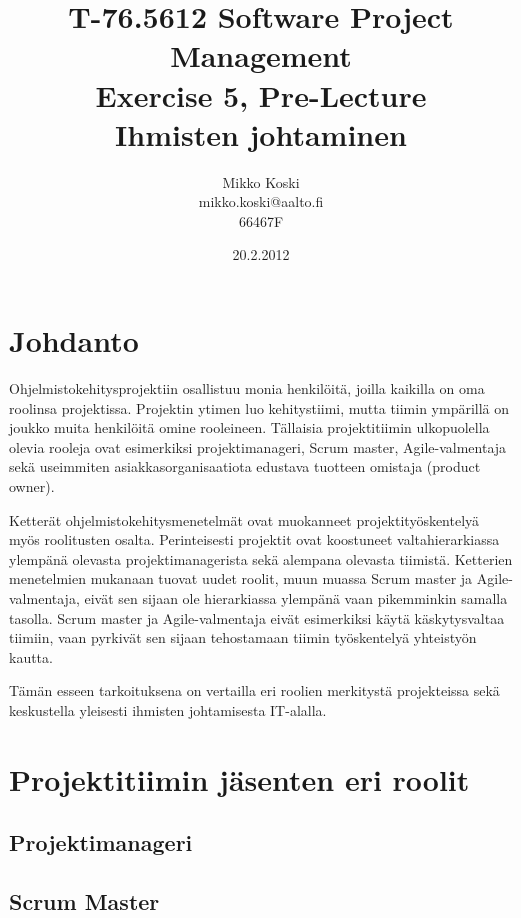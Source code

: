 \documentclass[a4paper]{article}
\begin{document}
\title{\small T-76.5612 Software Project Management \\ Exercise 5, Pre-Lecture \\ \huge Ihmisten johtaminen}
\date{20.2.2012}
\author{Mikko Koski \\ mikko.koski@aalto.fi \\ 66467F}
\maketitle

\normalsize

\section{Johdanto}

Ohjelmistokehitysprojektiin osallistuu monia henkilöitä, joilla kaikilla on oma roolinsa projektissa. Projektin ytimen luo kehitystiimi, mutta tiimin ympärillä on joukko muita henkilöitä omine rooleineen. Tällaisia projektitiimin ulkopuolella olevia rooleja ovat esimerkiksi projektimanageri, Scrum master, Agile-valmentaja sekä useimmiten asiakkasorganisaatiota edustava tuotteen omistaja (product owner).

Ketterät ohjelmistokehitysmenetelmät ovat muokanneet projektityöskentelyä myös roolitusten osalta. Perinteisesti projektit ovat koostuneet valtahierarkiassa ylempänä olevasta projektimanagerista sekä alempana olevasta tiimistä. Ketterien menetelmien mukanaan tuovat uudet roolit, muun muassa Scrum master ja Agile-valmentaja, eivät sen sijaan ole hierarkiassa ylempänä vaan pikemminkin samalla tasolla. Scrum master ja Agile-valmentaja eivät esimerkiksi käytä käskytysvaltaa tiimiin, vaan pyrkivät sen sijaan tehostamaan tiimin työskentelyä yhteistyön kautta.

Tämän esseen tarkoituksena on vertailla eri roolien merkitystä projekteissa sekä keskustella yleisesti ihmisten johtamisesta IT-alalla.

\section{Projektitiimin jäsenten eri roolit}

\subsection{Projektimanageri}

\subsection{Scrum Master}
\end{document}
